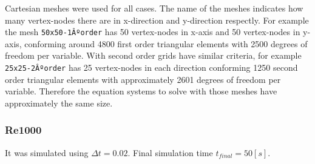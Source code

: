 \documentclass[a4paper,conference]{IEEEtran}
\begin{document}

Cartesian meshes were used for all cases. The name of the meshes indicates how many vertex-nodes there are in x-direction and y-direction respectly. For example the mesh \texttt{50x50-1Âºorder} has 50 vertex-nodes in x-axis and 50 vertex-nodes in y-axis, conforming around 4800 first order triangular elements with 2500 degrees of freedom per variable. With second order grids have similar criteria, for example \texttt{25x25-2Âºorder} has 25 vertex-nodes in each direction conforming 1250 second order triangular elements with approximately 2601 degrees of freedom per variable. Therefore the equation systems to solve with those meshes have approximately the same size.

\subsubsection{Re1000}

It was simulated using $\Delta t = 0.02$. Final simulation time $t_{final} = 50[s]$.
\end{document}
